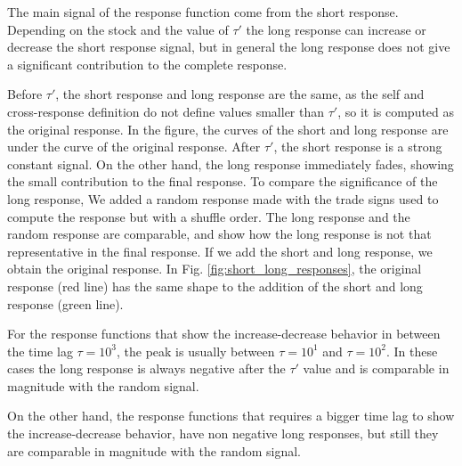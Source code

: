 The main signal of the response function come from the short response.
Depending on the stock and the value of $\tau'$ the long response can increase
or decrease the short response signal, but in general the long response does
not give a significant contribution to the complete response.

Before $\tau'$, the short response and long response are the same, as the self
and cross-response definition do not define values smaller than $\tau '$, so it
is computed as the original response. In the figure, the curves of the short
and long response are under the curve of the original response. After $\tau'$,
the short response is a strong constant signal. On the other hand, the long
response immediately fades, showing the small contribution to the final
response. To compare the significance of the long response, We added a random
response made with the trade signs used to compute the response but with a
shuffle order. The long response and the random response are comparable, and
show how the long response is not that representative in the final response.
If we add the short and long response, we obtain the original response. In Fig.
\ref{fig:short_long_responses}, the original response (red line) has the same
shape to the addition of the short and long response (green line).

For the response functions that show the increase-decrease behavior in between
the time lag $\tau = 10^{3}$, the peak is usually between $\tau = 10^{1}$ and
$\tau = 10^{2}$. In these cases the long response is always negative after the
$\tau'$ value and is comparable in magnitude with the random signal.

On the other hand, the response functions that requires a bigger time lag to
show the increase-decrease behavior, have non negative long responses, but
still they are comparable in magnitude with the random signal.